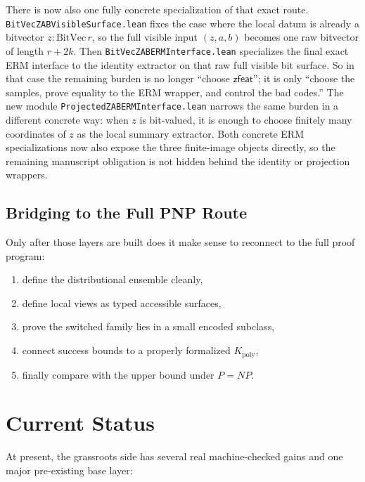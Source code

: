 \documentclass[11pt]{article}
\theoremstyle{remark}
\begin{document}
There is now also one fully concrete specialization of that exact route.
\texttt{BitVecZABVisibleSurface.lean} fixes the case where the local datum is
already a bitvector \(z : \mathrm{BitVec}\, r\), so the full visible input
\((z,a,b)\) becomes one raw bitvector of length \(r+2k\).  Then
\texttt{BitVecZABERMInterface.lean} specializes the final exact ERM interface
to the identity extractor on that raw full visible bit surface.  So in that
case the remaining burden is no longer “choose \(\mathsf{zfeat}\)”; it is only
“choose the samples, prove equality to the ERM wrapper, and control the bad
codes.”  The new module \texttt{ProjectedZABERMInterface.lean} narrows the same
burden in a different concrete way: when \(z\) is bit-valued, it is enough to
choose finitely many coordinates of \(z\) as the local summary extractor.
Both concrete ERM specializations now also expose the three finite-image
objects directly, so the remaining manuscript obligation is not hidden behind
the identity or projection wrappers.

\subsection{Bridging to the Full PNP Route}

Only after those layers are built does it make sense to reconnect to the full
proof program:
\begin{enumerate}[leftmargin=1.5em]
  \item define the distributional ensemble cleanly,
  \item define local views as typed accessible surfaces,
  \item prove the switched family lies in a small encoded subclass,
  \item connect success bounds to a properly formalized \(K_{\mathrm{poly}}\),
  \item finally compare with the upper bound under \(P=NP\).
\end{enumerate}

\section{Current Status}

At present, the grassroots side has several real machine-checked gains and one
major pre-existing base layer:
\end{document}
